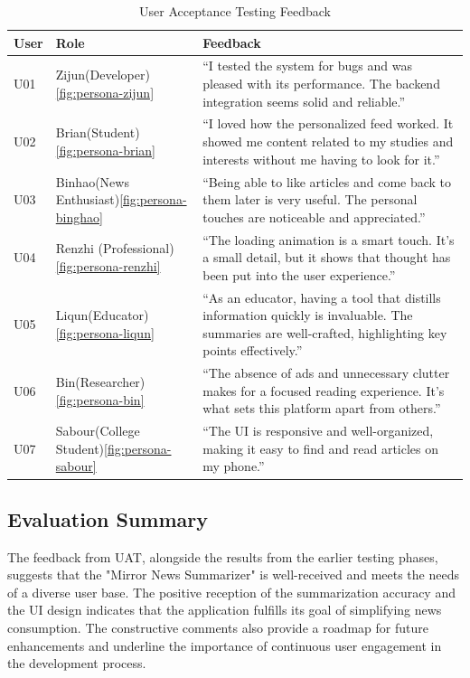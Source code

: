 \documentclass[10pt]{article}
\begin{document}
\begin{table}[H]
\centering
\begin{tabular}{|p{1cm}|p{4cm}|p{10cm}|}
\hline
\textbf{User} & \textbf{Role} & \textbf{Feedback} \\
\hline
U01 & Zijun(Developer)\ref{fig:persona-zijun} & ``I tested the system for bugs and was pleased with its performance. The backend integration seems solid and reliable.'' \\
\hline
U02 & Brian(Student)\ref{fig:persona-brian} & ``I loved how the personalized feed worked. It showed me content related to my studies and interests without me having to look for it.'' \\
\hline
U03 & Binhao(News Enthusiast)\ref{fig:persona-binghao} & ``Being able to like articles and come back to them later is very useful. The personal touches are noticeable and appreciated.'' \\
\hline
U04 & Renzhi (Professional)\ref{fig:persona-renzhi} & ``The loading animation is a smart touch. It's a small detail, but it shows that thought has been put into the user experience.'' \\
\hline
U05 & Liqun(Educator)\ref{fig:persona-liqun} & ``As an educator, having a tool that distills information quickly is invaluable. The summaries are well-crafted, highlighting key points effectively.'' \\
\hline
U06 & Bin(Researcher)\ref{fig:persona-bin} & ``The absence of ads and unnecessary clutter makes for a focused reading experience. It’s what sets this platform apart from others.'' \\
\hline
U07 & Sabour(College Student)\ref{fig:persona-sabour} & ``The UI is responsive and well-organized, making it easy to find and read articles on my phone.'' \\
\hline
\end{tabular}
\caption{User Acceptance Testing Feedback}
\label{table:uat_feedback}
\end{table}

\subsection{Evaluation Summary}

The feedback from UAT, alongside the results from the earlier testing phases, suggests that the "Mirror News Summarizer" is well-received and meets the needs of a diverse user base. The positive reception of the summarization accuracy and the UI design indicates that the application fulfills its goal of simplifying news consumption. The constructive comments also provide a roadmap for future enhancements and underline the importance of continuous user engagement in the development process.
\end{document}
